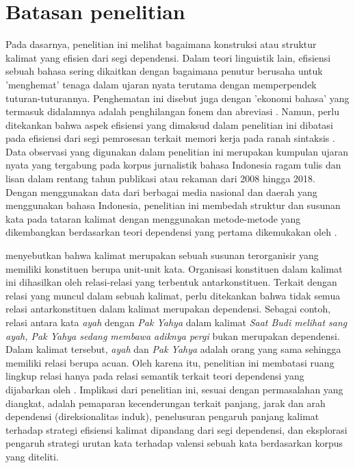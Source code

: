\section{Batasan penelitian}
Pada dasarnya, penelitian ini melihat bagaimana konstruksi atau struktur kalimat yang efisien dari segi dependensi. Dalam teori linguistik lain, efisiensi sebuah bahasa sering dikaitkan dengan bagaimana penutur berusaha untuk 'menghemat' tenaga dalam ujaran nyata terutama dengan memperpendek tuturan-tuturannya. Penghematan ini disebut juga dengan 'ekonomi bahasa' yang termasuk didalamnya adalah penghilangan fonem dan abreviasi \citep{verhaar1996asas}. Namun, perlu ditekankan bahwa aspek efisiensi yang dimaksud dalam penelitian ini dibatasi pada efisiensi dari segi pemrosesan terkait memori kerja pada ranah sintaksis \citep{hawkins2014cross}. Data observasi yang digunakan dalam penelitian ini merupakan kumpulan ujaran nyata yang tergabung pada korpus jurnalistik bahasa Indonesia ragam tulis dan lisan dalam rentang tahun publikasi atau rekaman dari 2008 hingga 2018. Dengan menggunakan data dari berbagai media nasional dan daerah yang menggunakan bahasa Indonesia, penelitian ini membedah struktur dan susunan kata pada tataran kalimat dengan menggunakan metode-metode yang dikembangkan berdasarkan teori dependensi yang pertama dikemukakan oleh \cite{tesniere1959elements}. 

\cite{tesniere1959elements} menyebutkan bahwa kalimat merupakan sebuah susunan terorganisir yang memiliki konstituen berupa unit-unit kata. Organisasi konstituen dalam kalimat ini dihasilkan oleh relasi-relasi yang terbentuk antarkonstituen. Terkait dengan relasi yang muncul dalam sebuah kalimat, perlu ditekankan bahwa tidak semua relasi antarkonstituen dalam kalimat merupakan dependensi. Sebagai contoh, relasi antara kata \textit{ayah} dengan \textit{Pak Yahya} dalam kalimat \textit{Saat Budi melihat sang ayah, Pak Yahya sedang membawa adiknya pergi} bukan merupakan dependensi. Dalam kalimat tersebut, \textit{ayah} dan \textit{Pak Yahya} adalah orang yang sama sehingga memiliki relasi berupa acuan. Oleh karena itu, penelitian ini membatasi ruang lingkup relasi hanya pada relasi semantik terkait teori dependensi yang dijabarkan oleh \cite{tesniere1959elements}. Implikasi dari penelitian ini, sesuai dengan permasalahan yang diangkat, adalah pemaparan kecenderungan terkait panjang, jarak dan arah dependensi (direksionalitas induk), penelusuran pengaruh panjang kalimat terhadap strategi efisiensi kalimat dipandang dari segi dependensi, dan eksplorasi pengaruh strategi urutan kata terhadap valensi sebuah kata berdasarkan korpus yang diteliti. 

